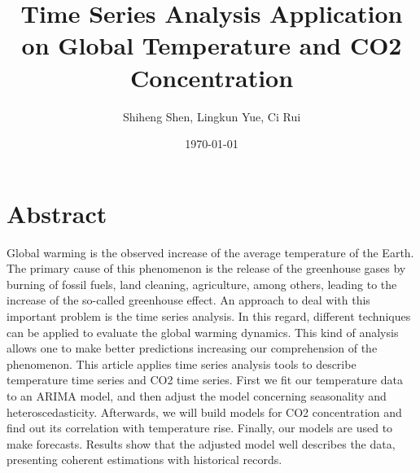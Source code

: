 \documentclass[a4paper,11pt]{article}
\title{\textbf{Time Series Analysis Application on Global Temperature and CO2 Concentration}}
\author{Shiheng Shen, Lingkun Yue, Ci Rui}
\date{\today}
\begin{document}
\maketitle

\tableofcontents

\newpage

\section{Abstract}
Global warming is the observed increase of the average temperature of the Earth. The primary cause of this phenomenon is the release of the greenhouse gases by burning of fossil fuels, land cleaning, agriculture, among others, leading to the increase of the so-called greenhouse effect. An approach to deal with this important problem is the time series analysis. In this regard, different techniques can be applied to evaluate the global warming dynamics. This kind of analysis allows one to make better predictions increasing our comprehension of the phenomenon. This article applies time series analysis tools to describe temperature time series and CO2 time series. First we fit our temperature data to an ARIMA model, and then adjust the model concerning seasonality and heteroscedasticity. Afterwards, we will build models for CO2 concentration and find out its correlation with temperature rise. Finally, our models are used to make forecasts. Results show that the adjusted model well describes the data, presenting coherent estimations with historical records.\par
\end{document}
